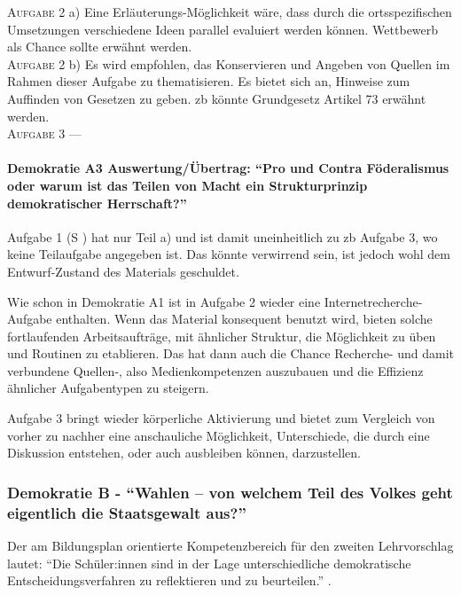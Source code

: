 \textsc{Aufgabe 2} a) \quad
Eine Erläuterungs-Möglichkeit wäre, dass durch die ortsspezifischen Umsetzungen verschiedene Ideen parallel evaluiert werden können. 
Wettbewerb als Chance sollte erwähnt werden. 
\\

\textsc{Aufgabe 2} b) \quad
Es wird empfohlen, das Konservieren und Angeben von Quellen im Rahmen dieser Aufgabe zu thematisieren.
Es bietet sich an, Hinweise zum Auffinden von Gesetzen zu geben. \Gls{zb} könnte Grundgesetz Artikel 73 erwähnt werden.
\\

\textsc{Aufgabe 3} \quad
---


\paragraph{Demokratie A3 Auswertung/Übertrag: \enquote{Pro und Contra Föderalismus oder warum ist das Teilen von Macht ein Strukturprinzip demokratischer Herrschaft?}}
Aufgabe 1 (\gls{S} \pageref{DEMOKRATIE-A3}) hat nur Teil a) und ist damit uneinheitlich zu \gls{zb} Aufgabe 3, wo keine Teilaufgabe angegeben ist. Das könnte verwirrend sein, ist jedoch wohl dem Entwurf-Zustand des Materials geschuldet. 

Wie schon in Demokratie A1 ist in Aufgabe 2 wieder eine Internetrecherche-Aufgabe enthalten. Wenn das Material konsequent benutzt wird, bieten solche fortlaufenden Arbeitsaufträge, mit ähnlicher Struktur, die Möglichkeit zu üben und Routinen zu etablieren. Das hat dann auch die Chance   Recherche- und damit verbundene Quellen-, also Medienkompetenzen auszubauen und die Effizienz ähnlicher Aufgabentypen zu steigern.

Aufgabe 3 bringt wieder körperliche Aktivierung und bietet zum Vergleich von vorher zu nachher eine anschauliche Möglichkeit, Unterschiede, die durch eine Diskussion entstehen, oder auch ausbleiben können, darzustellen. 



\subsubsection{Demokratie B - \enquote{Wahlen – von welchem Teil des Volkes geht eigentlich die Staatsgewalt aus?}}
Der am Bildungsplan orientierte Kompetenzbereich für den zweiten Lehrvorschlag %
lautet: \enquote{Die Schüler:innen sind in der Lage unterschiedliche demokratische Entscheidungsverfahren zu reflektieren und zu beurteilen.} \autocite[][16]{bplan}. 

